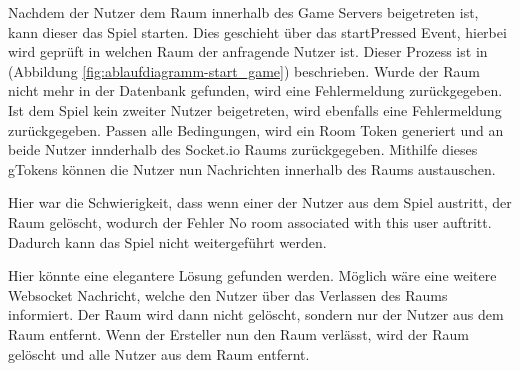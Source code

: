 \documentclass[
]{article}
\begin{document}
Nachdem der Nutzer dem Raum innerhalb des Game Servers beigetreten ist, kann dieser das Spiel starten.
Dies geschieht über das startPressed Event, hierbei wird geprüft in welchen Raum der anfragende Nutzer ist.
Dieser Prozess ist in (Abbildung \ref{fig:ablaufdiagramm-start_game}) beschrieben.
Wurde der Raum nicht mehr in der Datenbank gefunden, wird eine Fehlermeldung zurückgegeben.
Ist dem Spiel kein zweiter Nutzer beigetreten, wird ebenfalls eine Fehlermeldung zurückgegeben.
Passen alle Bedingungen, wird ein Room Token generiert und an beide Nutzer innderhalb des Socket.io Raums zurückgegeben.
Mithilfe dieses gTokens können die Nutzer nun Nachrichten innerhalb des Raums austauschen.

Hier war die Schwierigkeit, dass wenn einer der Nutzer aus dem Spiel austritt, der Raum gelöscht, wodurch der Fehler
\glqq No room associated with this user\grqq{} auftritt. Dadurch kann das Spiel nicht weitergeführt werden.

Hier könnte eine elegantere Lösung gefunden werden. Möglich wäre eine weitere Websocket Nachricht, welche den Nutzer 
über das Verlassen des Raums informiert. Der Raum wird dann nicht gelöscht, sondern nur der Nutzer aus dem Raum entfernt.
Wenn der Ersteller nun den Raum verlässt, wird der Raum gelöscht und alle Nutzer aus dem Raum entfernt.
\end{document}
